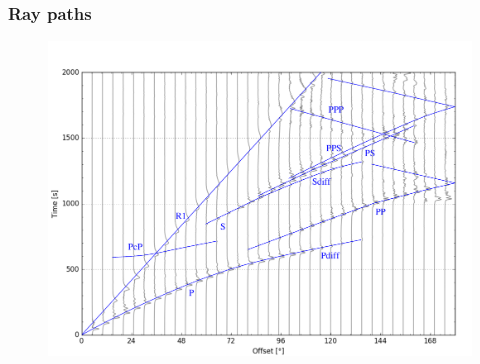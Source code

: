 \documentclass[compress,framenumber]{beamer}
\begin{document}
\begin{frame}
  \frametitle{Ray paths}
  \vspace{-4.0em}
  \begin{figure}
    \includegraphics[width=0.95\linewidth]{figures/record_section.pdf}
  \end{figure}
\end{frame}
\end{document}
